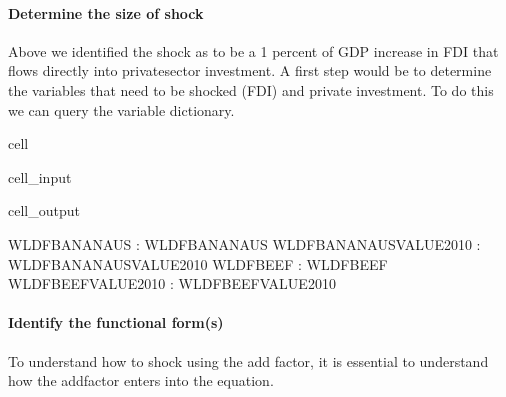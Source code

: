 \documentclass[letterpaper,10pt,english]{jupyterBook}
\begin{document}
\paragraph{Determine the size of shock}
\label{\detokenize{content/06_WBModels/ScenarioAnalysis:determine-the-size-of-shock}}
\sphinxAtStartPar
Above we identified the shock as to be a 1 percent of GDP increase in FDI that flows directly into private\sphinxhyphen{}sector investment.  A first step would be to determine the variables that need to be shocked (FDI) and private investment. To do this we can query the variable dictionary.

\begin{sphinxuseclass}{cell}\begin{sphinxVerbatimInput}

\begin{sphinxuseclass}{cell_input}
\begin{sphinxVerbatim}[commandchars=\\\{\}]
\PYG{p}{[}\PYG{p}{]}
\end{sphinxVerbatim}

\end{sphinxuseclass}\end{sphinxVerbatimInput}
\begin{sphinxVerbatimOutput}

\begin{sphinxuseclass}{cell_output}
\begin{sphinxVerbatim}[commandchars=\\\{\}]
WLDFBANANA\PYGZus{}US            : WLDFBANANA\PYGZus{}US
WLDFBANANA\PYGZus{}US\PYGZus{}VALUE\PYGZus{}2010 : WLDFBANANA\PYGZus{}US\PYGZus{}VALUE\PYGZus{}2010
WLDFBEEF                 : WLDFBEEF
WLDFBEEF\PYGZus{}VALUE\PYGZus{}2010      : WLDFBEEF\PYGZus{}VALUE\PYGZus{}2010
\end{sphinxVerbatim}

\end{sphinxuseclass}\end{sphinxVerbatimOutput}

\end{sphinxuseclass}

\paragraph{Identify the functional form(s)}
\label{\detokenize{content/06_WBModels/ScenarioAnalysis:identify-the-functional-form-s}}
\sphinxAtStartPar
To understand how to shock using the add factor, it is essential to understand how the add\sphinxhyphen{}factor enters into the equation.
\end{document}
